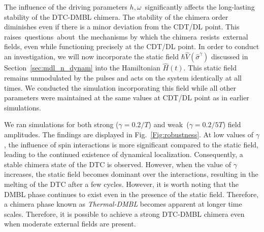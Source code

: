 \documentclass[12pt]{iopart}
\begin{document}
The influence of the driving parameters $h, \omega$ significantly affects the long-lasting stability of the DTC-DMBL chimera. The stability of the chimera order diminishes even if there is a minor deviation from the CDT/DL point. This raises questions about the mechanisms by which the chimera resists external fields, even while functioning precisely at the CDT/DL point.
In order to conduct an investigation, we will now incorporate the static field $\hbar\hat{V}(\hat{\sigma}^{\gamma})$ discussed in Section~\ref{sec:mdl_n_dynam} into the Hamiltonian $\hat{H}(t)$. This static field remains unmodulated by the pulses and acts on the system identically at all times. We conducted the simulation incorporating this field while all other parameters were maintained at the same values at CDT/DL point as in earlier simulations. 

We ran simulations for both strong ($\gamma=0.2/T$) and weak ($ \gamma= 0.2/5T$) field amplitudes. The findings are displayed in Fig.~\ref{Fig:robustness}. At low values of $\gamma$, the influence of spin interactions is more significant compared to the static field, leading to the continued existence of dynamical localization. Consequently, a stable chimera state of the DTC is observed. However, when the value of $\gamma$ increases, the static field becomes dominant over the interactions, resulting in the melting of the DTC after a few cycles. However, it is worth noting that the DMBL phase continues to exist even in the presence of the static field. Therefore, a chimera phase known as \textit{Thermal-DMBL} becomes apparent at longer time scales. Therefore, it is possible to achieve a strong DTC-DMBL chimera even when moderate external fields are present.
	
\end{document}
